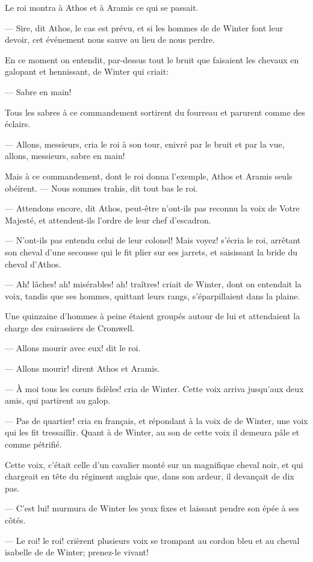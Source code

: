 Le roi montra à Athos et à Aramis ce qui se passait.

— Sire, dit Athos, le cas est prévu, et si les hommes de de Winter font leur devoir, cet événement nous sauve au lieu de nous perdre.

En ce moment on entendit, par-dessus tout le bruit que faisaient les chevaux en galopant et hennissant, de Winter qui criait:

— Sabre en main!

Tous les sabres à ce commandement sortirent du fourreau et parurent comme des éclairs.

— Allons, messieurs, cria le roi à son tour, enivré par le bruit et par la vue, allons, messieurs, sabre en main!

Mais à ce commandement, dont le roi donna l'exemple, Athos et Aramis seuls obéirent.
— Nous sommes trahis, dit tout bas le roi.

— Attendons encore, dit Athos, peut-être n'ont-ils pas reconnu la voix de Votre Majesté, et attendent-ils l'ordre de leur chef d'escadron.

— N'ont-ils pas entendu celui de leur colonel! Mais voyez! s'écria le roi, arrêtant son cheval d'une secousse qui le fit plier sur ses jarrets, et saisissant la bride du cheval d'Athos.

— Ah! lâches! ah! misérables! ah! traîtres! criait de Winter, dont on entendait la voix, tandis que ses hommes, quittant leurs rangs, s'éparpillaient dans la plaine.

Une quinzaine d'hommes à peine étaient groupés autour de lui et attendaient la charge des cuirassiers de Cromwell.

— Allons mourir avec eux! dit le roi.

— Allons mourir! dirent Athos et Aramis.

— À moi tous les cœurs fidèles! cria de Winter. Cette voix arriva jusqu'aux deux amis, qui partirent au galop.

— Pas de quartier! cria en français, et répondant à la voix de de Winter, une voix qui les fit tressaillir.
Quant à de Winter, au son de cette voix il demeura pâle et comme pétrifié.

Cette voix, c'était celle d'un cavalier monté sur un magnifique cheval noir, et qui chargeait en tête du régiment anglais que, dans son ardeur, il devançait de dix pas.

— C'est lui! murmura de Winter les yeux fixes et laissant pendre son épée à ses côtés.

— Le roi! le roi! crièrent plusieurs voix se trompant au cordon bleu et au cheval isabelle de de Winter; prenez-le vivant!

